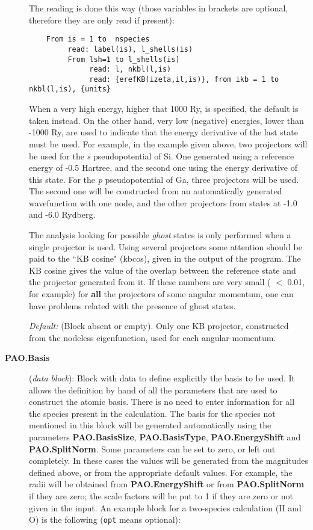 \documentclass[11pt]{article}
\begin{document}
\begin{description}
The reading is done this way (those variables in brackets are optional,
therefore they are only read if
present):

\begin{verbatim}
    From is = 1 to  nspecies
         read: label(is), l_shells(is)
         From lsh=1 to l_shells(is)
              read: l, nkbl(l,is)
              read: {erefKB(izeta,il,is)}, from ikb = 1 to nkbl(l,is), {units}
\end{verbatim}

When a very high energy, higher that 1000 Ry, is specified, the
default is taken instead.  On the other hand, very low (negative)
energies, lower than -1000 Ry, are used to indicate that the energy
derivative of the last state must be used. For example, in the example
given above, two projectors will be used for the {\it s}
pseudopotential of Si. One generated using a reference energy of -0.5
Hartree, and the second one using the energy derivative of this
state. For the {\it p} pseudopotential of Ga, three projectors will be
used.  The second one will be constructed from an automatically
generated wavefunction with one node, and the other projectors from
states at -1.0 and -6.0 Rydberg.

The analysis looking for possible {\it ghost} states is only performed
when a single projector is used.  Using several projectors some
attention should be paid to the ``KB cosine" (kbcos), given in the
output of the program.  The KB cosine gives the value of the overlap
between the reference state and the projector generated from it.  If
these numbers are very small ( $<$ 0.01, for example) for {\bf all}
the projectors of some angular momentum, one can have problems related
with the presence of ghost states.

{\it Default:} (Block absent or empty). Only one KB projector,
constructed from the nodeless eigenfunction, used for each angular
momentum.
\noindent

     
\item[{\bf PAO.Basis}] ({\it data block}):  
Block with data to define explicitly the
basis to be used.  It allows the definition by hand of all the
parameters that are used to construct the atomic basis. There is no
need to enter information for all the species present in the
calculation. The basis for the species not mentioned in
this block will be generated automatically using the parameters {\bf
PAO.BasisSize}, {\bf PAO.BasisType}, {\bf PAO.EnergyShift} and {\bf
PAO.SplitNorm}. Some parameters can be set to zero, or
left out completely.  In these cases the values will be generated from the
magnitudes defined above, or from the appropriate default values. For
example, the radii will be obtained from {\bf
PAO.EnergyShift} or from {\bf PAO.SplitNorm} if they are zero; the
scale factors will be put to 1 if they are zero or not given in the
input.  An example block for a two-species calculation (H and O) is
the following ({\tt opt} means optional):


\end{description}
\end{document}
